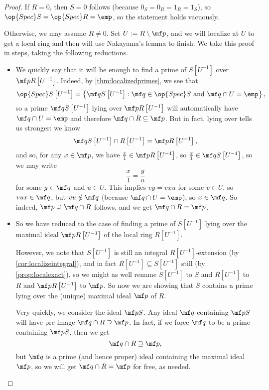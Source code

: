 \begin{proof}
	If $R=0$, then $S=0$ follows (because $0_S=0_R=1_R=1_S$), so $\op{Spec}S=\op{Spec}R=\emp$, so the statement holds vacuously.
	
	Otherwise, we may assume $R\ne0$. Set $U:=R\setminus\mf p$, and we will localize at $U$ to get a local ring and then will use Nakayama's lemma to finish. We take this proof in steps, taking the following reductions.
	\begin{itemize}
		\item We quickly say that it will be enough to find a prime of $S\left[U^{-1}\right]$ over $\mf pR\left[U^{-1}\right]$. Indeed, by \autoref{thm:localizedprimes}, we see that
		\[\op{Spec}S\left[U^{-1}\right]=\left\{\mf qS\left[U^{-1}\right]:\mf q\in\op{Spec}S\text{ and }\mf q\cap U=\emp\right\},\]
		so a prime $\mf qS\left[U^{-1}\right]$ lying over $\mf pR\left[U^{-1}\right]$ will automatically have $\mf q\cap U=\emp$ and therefore $\mf q\cap R\subseteq\mf p$. But in fact, lying over tells us stronger: we know
		\[\mf qS\left[U^{-1}\right]\cap R\left[U^{-1}\right]=\mf pR\left[U^{-1}\right],\]
		and so, for any $x\in\mf p$, we have $\frac x1\in\mf pR\left[U^{-1}\right]$, so $\frac{x}1\in\mf qS\left[U^{-1}\right]$, so we may write
		\[\frac{x}1=\frac y{u}\]
		for some $y\in\mf q$ and $u\in U$. This implies $vy=vxu$ for some $v\in U$, so $vux\in\mf q$, but $vu\notin\mf q$ (because $\mf q\cap U=\emp$), so $x\in\mf q$. So indeed, $\mf p\supseteq\mf q\cap R$ follows, and we get $\mf q\cap R=\mf p$.
	
		\item So we have reduced to the case of finding a prime of $S\left[U^{-1}\right]$ lying over the maximal ideal $\mf pR\left[U^{-1}\right]$ of the local ring $R\left[U^{-1}\right]$.
		
		However, we note that $S\left[U^{-1}\right]$ is still an integral $R\left[U^{-1}\right]$-extension (by \autoref{cor:localizeintegral}), and in fact $R\left[U^{-1}\right]\subseteq S\left[U^{-1}\right]$ still (by \autoref{prop:localexact}), so we might as well rename $S\left[U^{-1}\right]$ to $S$ and $R\left[U^{-1}\right]$ to $R$ and $\mf pR\left[U^{-1}\right]$ to $\mf p$. So now we are showing that $S$ contains a prime lying over the (unique) maximal ideal $\mf p$ of $R$.
		
		Very quickly, we consider the ideal $\mf pS$. Any ideal $\mf q$ containing $\mf pS$ will have pre-image $\mf q\cap R\supseteq\mf p$. In fact, if we force $\mf q$ to be a prime containing $\mf pS$, then we get
		\[\mf q\cap R\supseteq\mf p,\]
		but $\mf q$ is a prime (and hence proper) ideal containing the maximal ideal $\mf p$, so we will get $\mf q\cap R=\mf p$ for free, as needed.
		

\end{itemize}
\end{proof}
